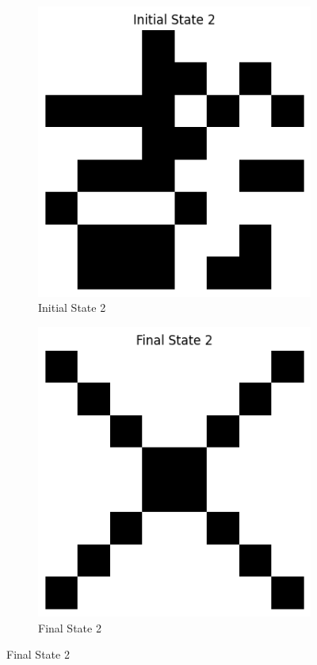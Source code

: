 \documentclass{article}
\begin{document}
\begin{figure}[H]
\begin{subfigure}{0.2\textwidth}
\includegraphics[width=\textwidth]{Initial State 2.png}
\caption{Initial State 2}
\end{subfigure}
\begin{subfigure}{0.2\textwidth}
\includegraphics[width=\textwidth]{Final State 2.png}
\caption{Final State 2}
\end{subfigure}


\end{figure}
\end{document}
